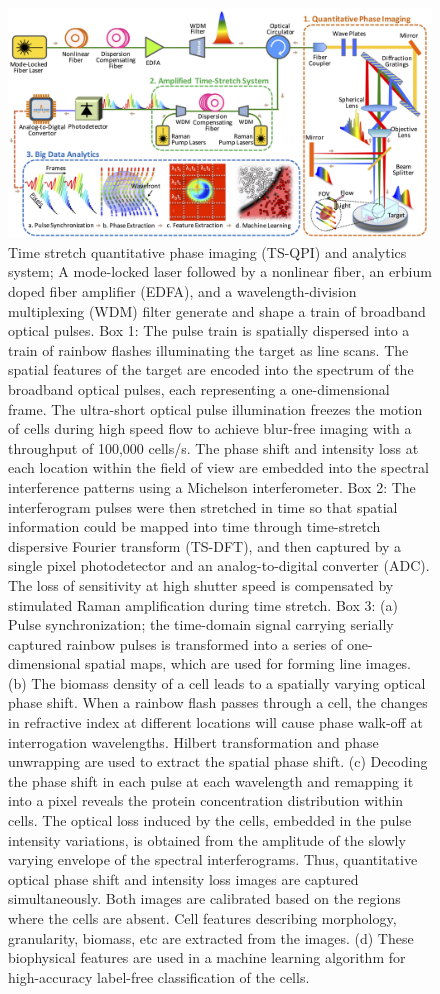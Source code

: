\documentclass[aps,pra,reprint,superscriptaddress]{revtex4-1}
\begin{document}
\begin{figure}
\includegraphics[scale=0.2]{FigureSetup.jpg}
\caption{\label{fig:Setup} Time stretch quantitative phase imaging (TS-QPI) and analytics system; A mode-locked laser followed by a nonlinear fiber, an erbium doped fiber amplifier (EDFA), and a wavelength-division multiplexing (WDM) filter generate and shape a train of broadband optical pulses. Box 1: The pulse train is spatially dispersed into a train of rainbow flashes illuminating the target as line scans. The spatial features of the target are encoded into the spectrum of the broadband optical pulses, each representing a one-dimensional frame. The ultra-short optical pulse illumination freezes the motion of cells during high speed flow to achieve blur-free imaging with a throughput of 100,000 cells/s. The phase shift and intensity loss at each location within the field of view are embedded into the spectral interference patterns using a Michelson interferometer. Box 2: The interferogram pulses were then stretched in time so that spatial information could be mapped into time through time-stretch dispersive Fourier transform (TS-DFT), and then captured by a single pixel photodetector and an analog-to-digital converter (ADC). The loss of sensitivity at high shutter speed is compensated by stimulated Raman amplification during time stretch. Box 3: (a) Pulse synchronization; the time-domain signal carrying serially captured rainbow pulses is transformed into a series of one-dimensional spatial maps, which are used for forming line images. (b) The biomass density of a cell leads to a spatially varying optical phase shift. When a rainbow flash passes through a cell, the changes in refractive index at different locations will cause phase walk-off at interrogation wavelengths. Hilbert transformation and phase unwrapping are used to extract the spatial phase shift. (c) Decoding the phase shift in each pulse at each wavelength and remapping it into a pixel reveals the protein concentration distribution within cells. The optical loss induced by the cells, embedded in the pulse intensity variations, is obtained from the amplitude of the slowly varying envelope of the spectral interferograms. Thus, quantitative optical phase shift and intensity loss images are captured simultaneously. Both images are calibrated based on the regions where the cells are absent. Cell features describing morphology, granularity, biomass, etc are extracted from the images. (d) These biophysical features are used in a machine learning algorithm for high-accuracy label-free classification of the cells.}

\end{figure}
\end{document}
